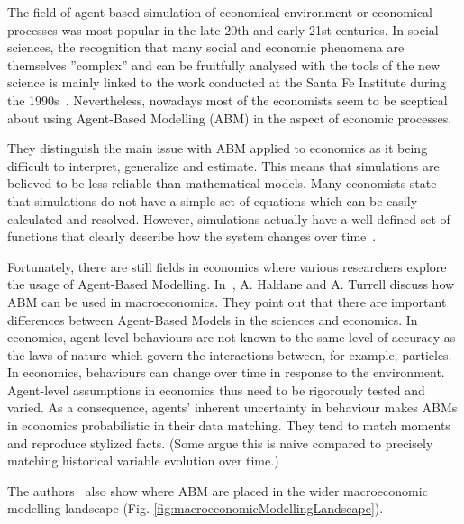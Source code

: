 \documentclass[english]{projectreport}
\begin{document}
The field of agent-based simulation of economical environment or economical processes was most popular in the late 20th and early 21st centuries. In social sciences, the recognition that many social and economic phenomena are themselves ''complex'' and can be fruitfully analysed with the tools of the new science is mainly linked to the work conducted at the Santa Fe Institute during the 1990s~\cite{TheEconomyAsAnEvolvingComplexSystem1988, TheEconomyAsAnEvolvingComplexSystem1997}. Nevertheless, nowadays most of the economists seem to be sceptical about using Agent-Based Modelling (ABM) in the aspect of economic processes. 

They distinguish the main issue with ABM applied to economics as it being difficult to interpret, generalize and estimate. This means that simulations are believed to be less reliable than mathematical models. Many economists state that simulations do not have a simple set of equations which can be easily calculated and resolved. However, simulations actually have a well-defined set of functions that clearly describe how the system changes over time~\cite{WhyAreEconomistsSceptical2005}.

Fortunately, there are still fields in economics where various researchers explore the usage of Agent-Based Modelling. In~\cite{DrawingOnDifferentDisciplinesMacroeconomicAgentBasedModels2019}, A. Haldane and A. Turrell discuss how ABM can be used in macroeconomics. They point out that there are important differences between Agent-Based Models in the sciences and economics. In economics,  agent-level behaviours are not known to the same level of accuracy as the laws of nature which govern the interactions between, for example, particles. In economics, behaviours can change over time in response to the environment. Agent-level assumptions in economics thus need to be rigorously tested and varied. As a consequence, agents’ inherent uncertainty in behaviour makes ABMs in economics probabilistic in their data matching. They tend to match moments and reproduce stylized facts. (Some argue this is naive compared to precisely matching historical variable evolution over time.)

The authors~\cite{DrawingOnDifferentDisciplinesMacroeconomicAgentBasedModels2019} also show where ABM are placed in the wider macroeconomic modelling landscape (Fig. \ref{fig:macroeconomicModellingLandscape}).
\end{document}
